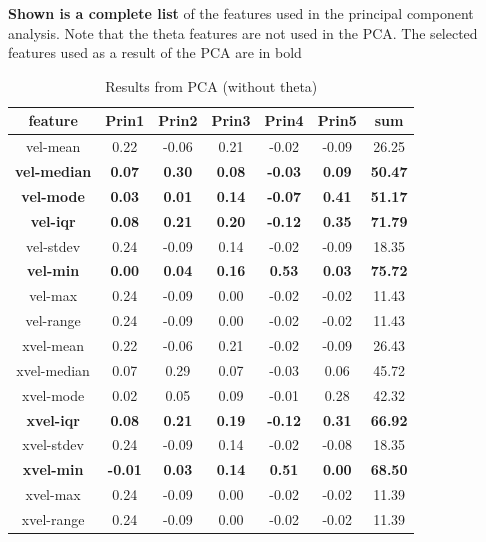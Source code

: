 \iffalse
\begin{table}[h!]
	\centering
	\caption{Results from PCA (without theta)}
	{\small \textbf{Shown is a complete list} of the features used in the principal component analysis. Note that the theta features are not used in the PCA. The selected features used as a result of the PCA are in bold}
	\bigskip
	\label{tab:pca-without-theta-results}
	\begin{tabular}{|c|c|c|c|c|c|c|}
		\hline
		\textbf{feature} & \textbf{Prin1} & \textbf{Prin2} & \textbf{Prin3} & \textbf{Prin4} & \textbf{Prin5} & \textbf{sum} \\
		\hline
		vel-mean & 0.22 & -0.06 & 0.21 & -0.02 & -0.09 & 26.25 \\
		\textbf{vel-median} & \textbf{0.07} & \textbf{0.30} & \textbf{0.08} & \textbf{-0.03} & \textbf{0.09} & \textbf{50.47} \\
		\textbf{vel-mode} & \textbf{0.03} & \textbf{0.01} & \textbf{0.14} & \textbf{-0.07} & \textbf{0.41} & \textbf{51.17} \\
		\textbf{vel-iqr} & \textbf{0.08} & \textbf{0.21} & \textbf{0.20} & \textbf{-0.12} & \textbf{0.35} & \textbf{71.79} \\
		vel-stdev & 0.24 & -0.09 & 0.14 & -0.02 & -0.09 & 18.35 \\
		\textbf{vel-min} & \textbf{0.00} & \textbf{0.04} & \textbf{0.16} & \textbf{0.53} & \textbf{0.03} & \textbf{75.72} \\
		vel-max & 0.24 & -0.09 & 0.00 & -0.02 & -0.02 & 11.43 \\
		vel-range & 0.24 & -0.09 & 0.00 & -0.02 & -0.02 & 11.43 \\
		xvel-mean & 0.22 & -0.06 & 0.21 & -0.02 & -0.09 & 26.43 \\
		xvel-median & 0.07 & 0.29 & 0.07 & -0.03 & 0.06 & 45.72 \\
		xvel-mode & 0.02 & 0.05 & 0.09 & -0.01 & 0.28 & 42.32 \\
		\textbf{xvel-iqr} & \textbf{0.08} & \textbf{0.21} & \textbf{0.19} & \textbf{-0.12} & \textbf{0.31} & \textbf{66.92} \\
		xvel-stdev & 0.24 & -0.09 & 0.14 & -0.02 & -0.08 & 18.35 \\
		\textbf{xvel-min} & \textbf{-0.01} & \textbf{0.03} & \textbf{0.14} & \textbf{0.51} & \textbf{0.00} & \textbf{68.50} \\
		xvel-max & 0.24 & -0.09 & 0.00 & -0.02 & -0.02 & 11.39 \\
		xvel-range & 0.24 & -0.09 & 0.00 & -0.02 & -0.02 & 11.39 \\

\end{tabular}
\end{table}
